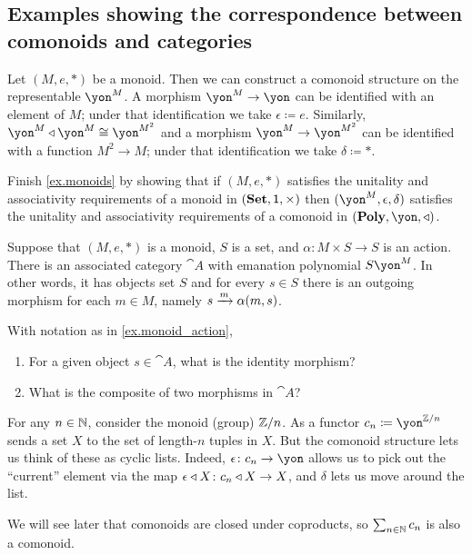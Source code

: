 \documentclass[Book-Poly]{subfiles}
\begin{document}
\subsection{Examples showing the correspondence between comonoids and categories}

\begin{example}[Monoids]\label{ex.monoids}
Let $(M,e,*)$ be a monoid. Then we can construct a comonoid structure on the representable $\yon^M$. A morphism $\yon^M\to\yon$ can be identified with an element of $M$; under that identification we take $\epsilon\coloneqq e$. Similarly, $\yon^M\tri\yon^M\cong\yon^{M^2}$ and a morphism $\yon^M\to\yon^{M^2}$ can be identified with a function $M^2\to M$; under that identification we take $\delta\coloneqq *$.
\end{example}

\begin{exercise}
Finish \cref{ex.monoids} by showing that if $(M,e,*)$ satisfies the unitality and associativity requirements of a monoid in $(\mathbf{Set},\textsf{1},\times)$ then $(\yon^M,\epsilon,\delta)$ satisfies the unitality and associativity requirements of a comonoid in $(\poly,\yon,\tri)$.
\end{exercise}


\begin{example}\label{ex.monoid_action}
Suppose that $(M,e,*)$ is a monoid, $S$ is a set, and $\alpha \colon M \times S \to S$ is an action. There is an associated category $\cat{A}$ with emanation polynomial $S \yon ^ M$. In other words, it has objects set $S$ and for every $s \in S$ there is an outgoing morphism for each $m \in M$, namely $s \xrightarrow{m} \alpha (m , s)$. 
\end{example}

\begin{exercise}
With notation as in \cref{ex.monoid_action},
\begin{enumerate}
    \item For a given object $s \in \cat{A}$, what is the identity morphism?
    \item What is the composite of two morphisms in $\cat{A}$?
\qedhere
\end{enumerate}
\end{exercise}



\begin{example}
For any $n\in\mathbb{N}$, consider the monoid (group) $\mathbb{Z}/n$. As a functor $c_n\coloneqq\yon^{\zz/n}$ sends a set $X$ to the set of length-$n$ tuples in $X$. But the comonoid structure lets us think of these as cyclic lists. Indeed, $\epsilon\colon c_n\to\yon$ allows us to pick out the ``current'' element via the map $\epsilon\mathbin{\triangleleft} X\colon c_n\mathbin{\triangleleft} X\to X$, and $\delta$ lets us move around the list.

We will see later that comonoids are closed under coproducts, so $\sum_{n\in\mathbb{N}}c_n$ is also a comonoid.
\end{example}
\end{document}
